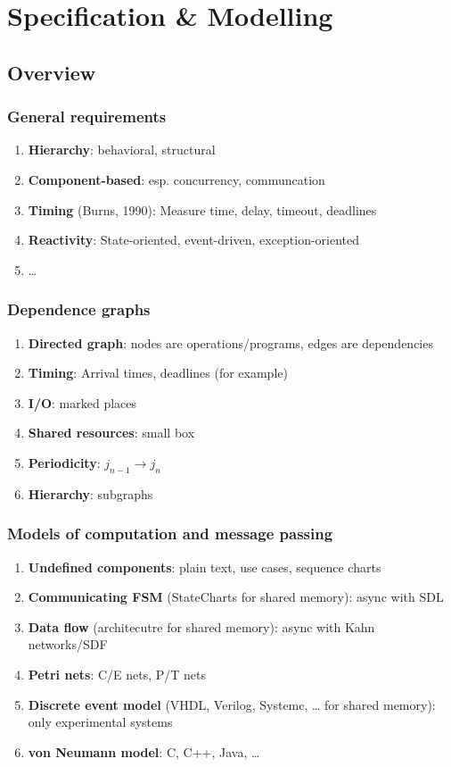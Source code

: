 \documentclass{article}
\author{Leopold Lemmermann}
\begin{document}
\createtitle

\section{Specification \& Modelling}

\subsection{Overview}
\subsubsection{General requirements}
\begin{enumerate}
  \item \textbf{Hierarchy}: behavioral, structural
  \item \textbf{Component-based}: esp. concurrency, communcation
  \item \textbf{Timing} (Burns, 1990): Measure time, delay, timeout, deadlines
  \item \textbf{Reactivity}: State-oriented, event-driven, exception-oriented
  \item …
\end{enumerate}

\subsubsection{Dependence graphs}
\begin{enumerate}
  \item \textbf{Directed graph}: nodes are operations/programs, edges are dependencies
  \item \textbf{Timing}: Arrival times, deadlines (for example)
  \item \textbf{I/O}: marked places
  \item \textbf{Shared resources}: small box
  \item \textbf{Periodicity}: $j_{n-1} \rightarrow j_n$
  \item \textbf{Hierarchy}: subgraphs
\end{enumerate}

\subsubsection{Models of computation and message passing}
\begin{enumerate}
  \item \textbf{Undefined components}: plain text, use cases, sequence charts
  \item \textbf{Communicating FSM} (StateCharts for shared memory): async with SDL
  \item \textbf{Data flow} (architecutre for shared memory): async with Kahn networks/SDF
  \item \textbf{Petri nets}: C/E nets, P/T nets
  \item \textbf{Discrete event model} (VHDL, Verilog, Systemc, … for shared memory): only experimental systems
  \item \textbf{von Neumann model}: C, C++, Java, …
\end{enumerate}
\end{document}

